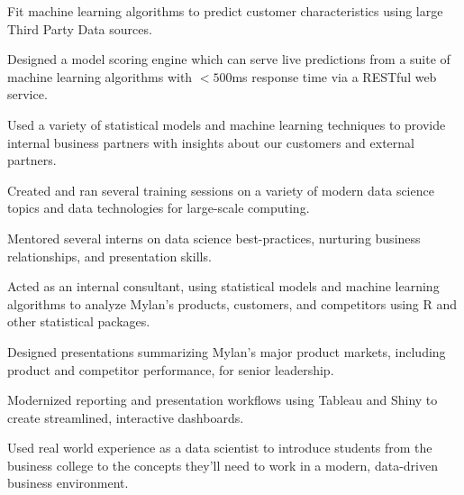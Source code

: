\documentclass[letterpaper]{deedy-resume} %
\begin{document}
\begin{minipage}[t]{0.65\textwidth}
\hfill
{}
\begin{tightitemize}
\item Fit machine learning algorithms to predict customer characteristics using
  large Third Party Data sources.
\item Designed a model scoring engine which 
  can serve live predictions from a suite of machine learning algorithms with
  $<500$ms response time via a RESTful web service.
\item Used a variety of statistical models and machine learning techniques to
  provide internal business partners with insights about our customers and
  external partners.
\item Created and ran several training sessions on a variety of modern data
  science topics and data technologies for large-scale computing.
\item Mentored several interns on data science best-practices, nurturing
  business relationships, and presentation skills.
\end{tightitemize}
\sectionspace


\hfill{}
\hfill{}
\begin{tightitemize}
\item Acted as an internal consultant, using statistical models and machine
  learning algorithms to 
  analyze Mylan's products, customers, and competitors using R and
  other statistical packages.
\item Designed presentations summarizing Mylan's major product markets,
  including product and competitor performance, for senior leadership.
\item Modernized reporting and presentation workflows using Tableau and
  Shiny to create streamlined, interactive dashboards.
\end{tightitemize}
\sectionspace %


\hfill{}
\hfill
{}
\begin{tightitemize}
\item Used real world experience as a data scientist to introduce
  students from the business college to the concepts they'll need to
  work in a modern, data-driven  business environment.
\end{tightitemize}
\sectionspace %


\end{minipage}
\end{document}
